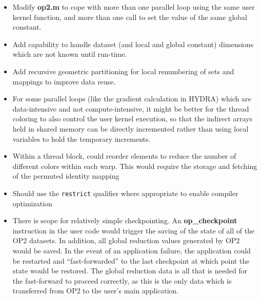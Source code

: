 \documentclass[12pt]{article}
\begin{document}
\begin{itemize}
\item
Modify {\bf op2.m} to cope with more than one parallel loop using 
the same user kernel function, and more than one call to set the 
value of the same global constant.

\item
Add capability to handle dataset (and local and global constant) dimensions 
which are not known until run-time.

\item
Add recursive geometric partitioning for local renumbering of sets and 
mappings to improve data reuse.

\item
For some parallel loops (like the gradient calculation in HYDRA)
which are data-intensive and not compute-intensive, it might be better 
for the thread coloring to also control the user kernel execution, so 
that the indirect arrays held in shared memory can be directly incremented 
rather than using local variables to hold the temporary increments.

\item
Within a thread block, could reorder elements to reduce the number of 
different colors within each warp.  This would require the storage and 
fetching of the permuted identity mapping 

\item
Should use the {\tt restrict} qualifier where appropriate to enable 
compiler optimization

\item
There is scope for relatively simple checkpointing. An {\bf op\_checkpoint} 
instruction in the user code would trigger the saving of the state of all
of the OP2 datasets.  In addition, all global reduction values generated by
OP2 would be saved.  In the event of an application failure, the application 
could be restarted and ``fast-forwarded'' to the last checkpoint at which
point the state would be restored.  The global reduction data is all that is
needed for the fast-forward to proceed correctly, as this is the only data 
which is transferred from OP2 to the user's main application.

\end{itemize}
\end{document}
